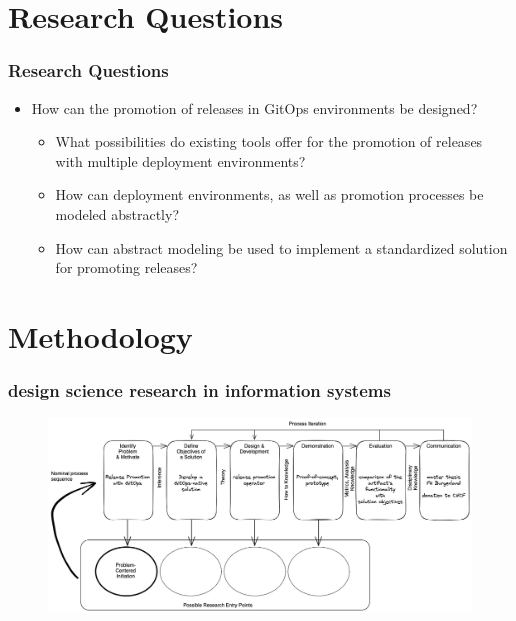 \documentclass{beamer}
\begin{document}
\section{Research Questions}

\begin{frame}
\frametitle{Research Questions}

	\begin{itemize}
		\item How can the promotion of releases in GitOps environments be designed?
		\begin{itemize}
			\item What possibilities do existing tools offer for the promotion of releases with multiple deployment environments?
			\item How can deployment environments, as well as promotion processes be modeled abstractly?
			\item How can abstract modeling be used to implement a standardized solution for promoting releases?
		\end{itemize}
	\end{itemize}

\end{frame}


\section{Methodology}

\begin{frame}
	\frametitle{design science research in information systems \\
		\autocite{designScienceResearchMethodologyForInformationSystemsResearch}}
	
	\begin{figure}[h]
		\centering
		\includegraphics[width=1.00\linewidth]{figures/dsrm-process-release-promotion-gitops.png}
	\end{figure}

\end{frame}
\end{document}
